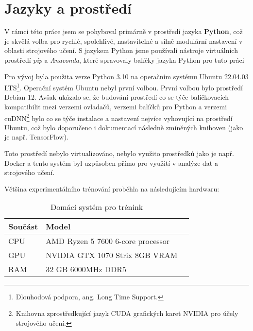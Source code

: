 \section{Jazyky a prostředí}
\label{sec:Chapter51}
V rámci této práce jsem se pohyboval primárně v prostředí jazyka \textbf{Python}, což je skvělá volba pro rychlé, spolehlivé, nastavitelné a silně modulární nastavení v oblasti strojového učení. S jazykem Python jsme používali nástroje virtuálních prostředí \textit{pip} a \textit{Anaconda}, které spravovaly balíčky jazyka Python pro tuto práci

Pro vývoj byla použita verze Python 3.10 na operačním systému Ubuntu 22.04.03 LTS\footnote{Dlouhodová podpora, ang. Long Time Support.}. Operační systém Ubuntu nebyl první volbou. První volbou bylo prostředí Debian 12. Avšak ukázalo se, že budování prostředí co se týče balíčkovacích kompatibilit mezi verzemi ovladačů, verzemi balíčků pro Python a verzemi cuDNN\footnote{Knihovna zprostředkující jazyk CUDA grafických karet NVIDIA pro účely strojového učení.} bylo co se týče instalace a nastavení nejvíce vyhovující na prostředí Ubuntu, což bylo doporučeno i dokumentací následně zmíněných knihoven (jako je např. TensorFlow).

Toto prostředí nebylo virtualizováno, nebylo využito prostředků jako je např. Docker a tento systém byl uzpůsoben přímo pro využití v analýze dat a strojového učení.

Většina experimentálního trénování proběhla na následujícím hardwaru:

\begin{table}[hb]
\centering
\begin{tabular}{@{}lll@{}}
\toprule
Součást & Model \\
\midrule
CPU & AMD Ryzen 5 7600 6-core processor \\
GPU & NVIDIA GTX 1070 Strix 8GB VRAM  \\
RAM & 32 GB 6000MHz DDR5 \\
\bottomrule
\end{tabular}
\caption{Domácí systém pro trénink}
\label{fig:wortelus_pc}
\end{table}
\endinput